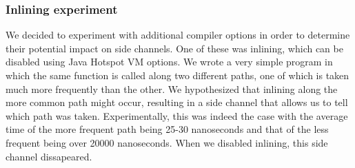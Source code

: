 \subsubsection{Inlining experiment} We decided to experiment with additional compiler options in order to determine their potential impact on side channels. One of these was inlining, which can be disabled using Java Hotspot VM options. We wrote a very simple program in which the same function is called along two different paths, one of which is taken much more frequently than the other. We hypothesized that inlining along the more common path might occur, resulting in a side channel that allows us to tell which path was taken. Experimentally, this was indeed the case with the average time of the more frequent path being 25-30 nanoseconds and that of the less frequent being over 20000 nanoseconds. When we disabled inlining, this side channel dissapeared. 
